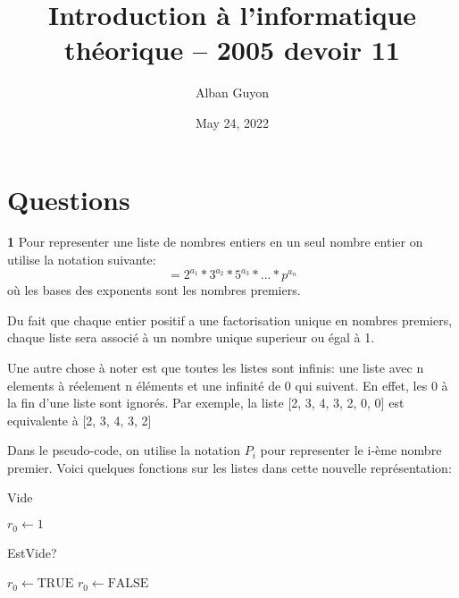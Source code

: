 \documentclass{article}
\title{Introduction à l'informatique théorique -- 2005 devoir 11}
\author{Alban Guyon}
\date{May 24, 2022}
\begin{document}
    \maketitle
    
    \section{Questions}
    
    \textbf{1}
    Pour representer une liste de nombres entiers en un seul nombre entier on utilise la notation suivante:
    \begin{equation}
    [a_1, a_2, a_3, ..., a_n, 0, 0, 0, ...] = 2^{a_1} * 3^{a_2} * 5^{a_3} * ... * p^{a_n}
    \end{equation}
    où les bases des exponents sont les nombres premiers.

    Du fait que chaque entier positif a une factorisation unique en nombres premiers, chaque liste
    sera associé à un nombre unique superieur ou égal à 1.

    Une autre chose à noter est que toutes les listes sont infinis: une liste avec n elements à réelement n
    éléments et une infinité de 0 qui suivent. En effet, les 0 à la fin d'une liste sont ignorés. 
    Par exemple, la liste [2, 3, 4, 3, 2, 0, 0] est equivalente à [2, 3, 4, 3, 2]

    Dans le pseudo-code, on utilise la notation $P_i$ pour representer le i-ème nombre premier.	
    Voici quelques fonctions sur les listes dans cette nouvelle représentation:

    \begin{algorithm}
        \caption{Vide}\label{Vide}
        \begin{algorithmic}[1]
        \State $\textit{$r_0$} \gets \text{1}$
        \EndProcedure
        \end{algorithmic}
    \end{algorithm}

    \begin{algorithm}
        \caption{EstVide?}\label{EstVide?}
        \begin{algorithmic}[1]
            \State $\textit{$r_0$} \gets \text{TRUE}$
        \Else {}
            \State $\textit{$r_0$} \gets \text{FALSE}$
        \EndIf
        \EndProcedure
        \end{algorithmic}
    \end{algorithm}
\end{document}
